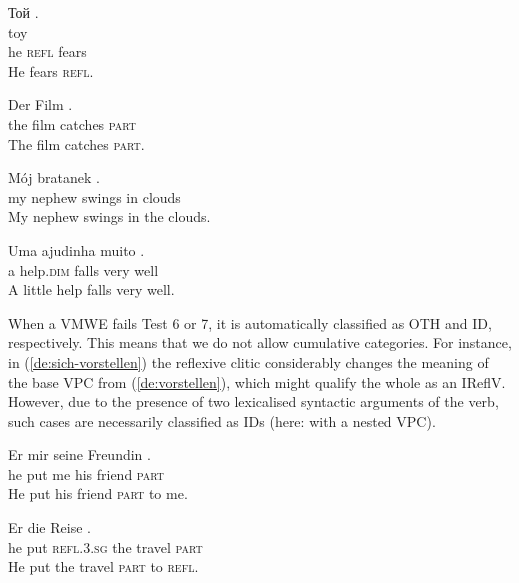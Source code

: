 \documentclass[output=paper,modfonts]{langscibook}
\begin{document}
\begin{itemize}
\ea \label{bg:self-fear}
\settowidth {} 
\glll Той \underline{} .\\
toy \underline{}  \\
he \textsc{refl} fears \\ 
\glt He fears \textsc{refl}. 
\z

\ea \label{de:anfangen}
\settowidth {} 
\gll Der Film  \underline{}.\\
the film catches \textsc{part} \\ 
\glt The film catches \textsc{part}. 
\z

\ea \label{pl:bujac-w-oblokach}
\settowidth {} 
\gll Mój bratanek  \underline{} \underline{}.\\
my nephew swings in clouds \\ 
\glt My nephew swings in the clouds. 
\z

\ea \label{pt:cai-bem}
\settowidth {} 
\gll Uma ajudinha  muito \underline{}. \\
a help.\textsc{dim} falls very well \\ 
\glt A little help falls very well. 
\z

\end{itemize}

When a VMWE fails Test 6 or 7, it is automatically classified as OTH and ID, respectively. This means that we do not allow cumulative categories. For instance, in (\ref{de:sich-vorstellen})
the reflexive clitic considerably changes the meaning of the base VPC from (\ref{de:vorstellen}), 
which might qualify the whole as an IReflV. However, due to the presence of two lexicalised syntactic arguments of the verb, such cases are necessarily classified as IDs (here: with a nested VPC). 

\ea \label{de:vorstellen}
\settowidth {} 
\gll Er  mir seine Freundin .\\
he put me his friend \textsc{part} \\ 
\glt He put his friend \textsc{part} to me. 
\z

\ea \label{de:sich-vorstellen}
\settowidth {} 
\gll Er   die Reise . \\
he put \textsc{refl.3.sg} the travel \textsc{part} \\ 
\glt He put the travel \textsc{part} to \textsc{refl}. 
\z
\end{document}
